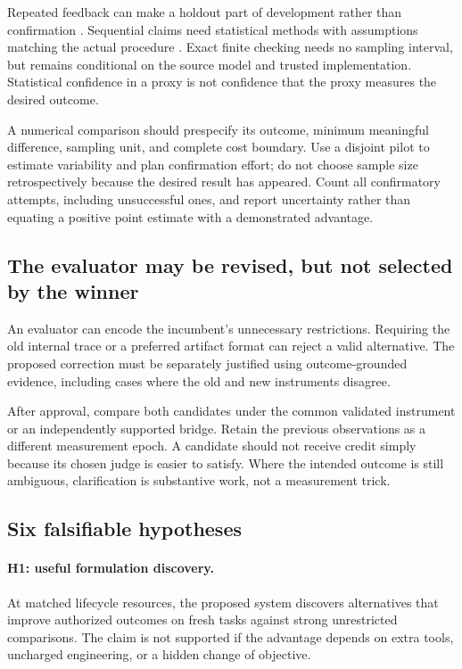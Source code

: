 \documentclass[11pt,letterpaper]{article}
\theoremstyle{remark}\newtheorem{remark}{Remark}[section]
\begin{document}
Repeated feedback can make a holdout part of development rather than confirmation \citep{dwork2014}. Sequential claims need statistical methods with assumptions matching the actual procedure \citep{howard2021}. Exact finite checking needs no sampling interval, but remains conditional on the source model and trusted implementation. Statistical confidence in a proxy is not confidence that the proxy measures the desired outcome.

A numerical comparison should prespecify its outcome, minimum meaningful difference, sampling unit, and complete cost boundary. Use a disjoint pilot to estimate variability and plan confirmation effort; do not choose sample size retrospectively because the desired result has appeared. Count all confirmatory attempts, including unsuccessful ones, and report uncertainty rather than equating a positive point estimate with a demonstrated advantage.

\subsection{The evaluator may be revised, but not selected by the winner}
An evaluator can encode the incumbent's unnecessary restrictions. Requiring the old internal trace or a preferred artifact format can reject a valid alternative. The proposed correction must be separately justified using outcome-grounded evidence, including cases where the old and new instruments disagree.

After approval, compare both candidates under the common validated instrument or an independently supported bridge. Retain the previous observations as a different measurement epoch. A candidate should not receive credit simply because its chosen judge is easier to satisfy. Where the intended outcome is still ambiguous, clarification is substantive work, not a measurement trick.

\subsection{Six falsifiable hypotheses}
\paragraph{H1: useful formulation discovery.}
At matched lifecycle resources, the proposed system discovers alternatives that improve authorized outcomes on fresh tasks against strong unrestricted comparisons. The claim is not supported if the advantage depends on extra tools, uncharged engineering, or a hidden change of objective.
\end{document}
